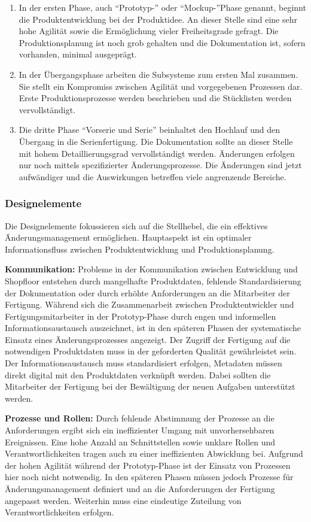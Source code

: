 \begin{enumerate}
 \item In der ersten Phase, auch ``Prototyp-'' oder ``Mockup-''Phase genannt, beginnt die Produktentwicklung bei der Produktidee. An dieser Stelle sind eine sehr hohe Agilität sowie die Ermöglichung vieler Freiheitsgrade gefragt. Die Produktionsplanung ist noch grob gehalten und die Dokumentation ist, sofern vorhanden, minimal ausgeprägt. 
 \item In der Übergangsphase arbeiten die Subsysteme zum ersten Mal zusammen. Sie stellt ein Kompromiss zwischen Agilität und vorgegebenen Prozessen dar. Erste Produktionsprozesse werden beschrieben und die Stücklisten werden vervollständigt. 
 \item Die dritte Phase ``Vorserie und Serie'' beinhaltet den Hochlauf und den Übergang in die Serienfertigung. Die Dokumentation sollte an dieser Stelle mit hohem Detaillierungsgrad vervollständigt werden. Änderungen erfolgen nur noch mittels spezifizierter Änderungsprozesse. Die Änderungen sind jetzt aufwändiger und die Auswirkungen betreffen viele angrenzende Bereiche. 
\end{enumerate}

\subsubsection*{Designelemente}
Die Designelemente fokussieren sich auf die Stellhebel, die ein effektives Änderungsmanagement ermöglichen. Hauptaspekt ist ein optimaler Informationsfluss zwischen Produktentwicklung und Produktionsplanung. 

\textbf{Kommunikation: }
Probleme in der Kommunikation zwischen Entwicklung und Shopfloor entstehen durch mangelhafte Produktdaten, fehlende Standardisierung der Dokumentation oder durch erhöhte Anforderungen an die Mitarbeiter der Fertigung. 
Während sich die Zusammenarbeit zwischen Produktentwickler und Fertigungsmitarbeiter in der Prototyp-Phase durch engen und informellen Informationsaustausch auszeichnet, ist in den späteren Phasen der systematische Einsatz eines Änderungsprozesses angezeigt. Der Zugriff der Fertigung auf die notwendigen Produktdaten muss in der geforderten Qualität gewährleistet sein. Der Informationsaustausch muss standardisiert erfolgen, Metadaten müssen direkt digital mit den Produktdaten verknüpft werden. Dabei sollten die Mitarbeiter der Fertigung bei der Bewältigung der neuen Aufgaben unterstützt werden. 

\textbf{Prozesse und Rollen: }
Durch fehlende Abstimmung der Prozesse an die Anforderungen ergibt sich ein ineffizienter Umgang mit unvorhersehbaren Ereignissen. Eine hohe Anzahl an Schnittstellen sowie unklare Rollen und Verantwortlichkeiten tragen auch zu einer ineffizienten Abwicklung bei. 
Aufgrund der hohen Agilität während der Prototyp-Phase ist der Einsatz von Prozessen hier noch nicht notwendig. In den späteren Phasen müssen jedoch Prozesse für Änderungsmanagement definiert und an die Anforderungen der Fertigung angepasst werden. 
Weiterhin muss eine eindeutige Zuteilung von Verantwortlichkeiten erfolgen. 

